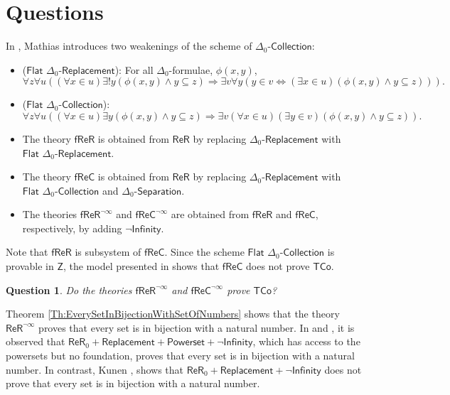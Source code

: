 \documentclass[11pt, a4paper]{article}
\newcounter{Theor1}
\newtheorem{question}[theorem]{Question}
\begin{document}
\section[Questions]{Questions}

In \cite{mat06}, Mathias introduces two weakenings of the scheme of $\Delta_0\textsf{-Collection}$:
\begin{itemize}
\item[]($\textsf{Flat } \Delta_0\textsf{-Replacement}$): For all $\Delta_0$-formulae, $\phi(x, y)$,
\[
\forall z \forall u ((\forall x \in u) \exists ! y (\phi(x, y) \land y \subseteq z) \Rightarrow \exists v \forall y( y \in v \iff (\exists x \in u) (\phi(x, y) \land y \subseteq z))).
\]
\item[]($\textsf{Flat } \Delta_0\textsf{-Collection}$):
\[
\forall z \forall u ((\forall x \in u)\exists y (\phi(x, y) \land y \subseteq z) \Rightarrow \exists v (\forall x \in u) (\exists y \in v) (\phi(x, y) \land y \subseteq z)).
\] 
\end{itemize}
\begin{itemize}
\item The theory $\mathsf{fReR}$ is obtained from $\mathsf{ReR}$ by replacing $\Delta_0\textsf{-Replacement}$ with $\textsf{Flat }\Delta_0\textsf{-Replacement}$.
\item The theory $\mathsf{fReC}$ is obtained from $\mathsf{ReR}$ by replacing $\Delta_0\textsf{-Replacement}$ with $\textsf{Flat }\Delta_0\textsf{-Collection}$ and $\Delta_0\textsf{-Separation}$.
\item The theories $\mathsf{fReR}^{\neg \infty}$ and $\mathsf{fReC}^{\neg \infty}$ are obtained from $\mathsf{fReR}$ and $\mathsf{fReC}$, respectively, by adding $\neg \mathsf{Infinity}$.  
\end{itemize}
Note that $\mathsf{fReR}$ is subsystem of $\mathsf{fReC}$. Since the scheme $\textsf{Flat } \Delta_0\textsf{-Collection}$ is provable in $\mathsf{Z}$, the model presented in \cite[\S 12]{mat06} shows that $\mathsf{fReC}$ does not prove $\mathsf{TCo}$.

\begin{question}
Do the theories $\mathsf{fReR}^{\neg \infty}$ and $\mathsf{fReC}^{\neg \infty}$ prove $\mathsf{TCo}$?
\end{question}
  
Theorem \ref{Th:EverySetInBijectionWithSetOfNumbers} shows that the theory $\mathsf{ReR}^{\neg \infty}$ proves that every set is in bijection with a natural number. In \cite[Corollary 10]{bf93} and \cite[Remark 2.2(d)]{esv09}, it is observed that $\mathsf{ReR}_0+\textsf{Replacement}+\textsf{Powerset}+\neg \textsf{Infinity}$, which has access to the powersets but no foundation, proves that every set is in bijection with a natural number. In contrast, Kunen \cite[\S 7]{bf93}, shows that $\mathsf{ReR}_0+\textsf{Replacement}+\neg\textsf{Infinity}$ does not prove that every set is in bijection with a natural number.
\end{document}
